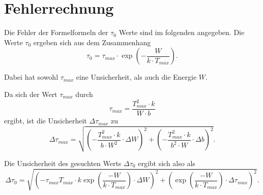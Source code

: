 \section{Fehlerrechnung}
\label{sec:fehler}


Die Fehler der Formelformeln der $\tau_0$ Werte sind im folgenden angegeben.
Die Werte $\tau_0$ ergeben sich aus dem Zusammenhang
\begin{equation*}
\tau_0 = \tau_{max} \cdot \exp(-\frac{W}{k \cdot T_{max}}).
\end{equation*}

Dabei hat sowohl $\tau_{max}$ eine Unsicherheit, als auch die Energie $W$. 

Da sich der Wert $\tau_{max}$ durch
\begin{equation*}
    \tau_{max} = \frac{T_{max}^2 \cdot k}{W \cdot b}
\end{equation*}
ergibt, ist die Unsicherheit $\Delta \tau_{max}$ zu 
\begin{equation*}
    \Delta \tau_{max} = \sqrt{\left(- \frac{T_{max}^2 \cdot k}{b \cdot W^2} \cdot \Delta W \right)^2 + \left(- \frac{T_{max}^2 \cdot k}{b^2 \cdot W}  \cdot \Delta b \right)^2}.
\end{equation*}

Die Unsicherheit des gesuchten Werts $\Delta \tau_0$ ergibt sich also als 
 \begin{equation*}
     \Delta \tau_0 = \sqrt{\left(- \tau_{max} T_{max} \cdot k \exp(\frac{-W}{k\cdot T_{max}}) \cdot \Delta W \right)^2 + \left(\exp(\frac{-W}{k\cdot T_{max}}) \cdot \Delta \tau_{max} \right)^2}.
 \end{equation*}